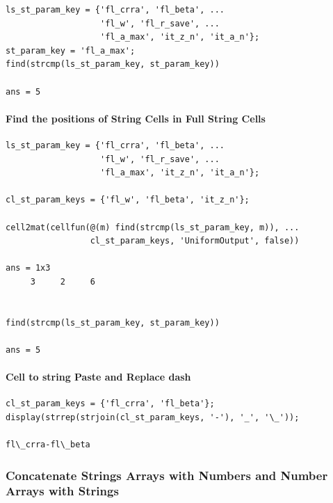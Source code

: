 \documentclass[
]{book}
\begin{document}
\begin{verbatim}
ls_st_param_key = {'fl_crra', 'fl_beta', ...
                   'fl_w', 'fl_r_save', ...
                   'fl_a_max', 'it_z_n', 'it_a_n'};
st_param_key = 'fl_a_max';
find(strcmp(ls_st_param_key, st_param_key))

ans = 5
\end{verbatim}

\hypertarget{find-the-positions-of-string-cells-in-full-string-cells}{%
\paragraph{Find the positions of String Cells in Full String Cells}\label{find-the-positions-of-string-cells-in-full-string-cells}}

\begin{verbatim}
ls_st_param_key = {'fl_crra', 'fl_beta', ...
                   'fl_w', 'fl_r_save', ...
                   'fl_a_max', 'it_z_n', 'it_a_n'};

cl_st_param_keys = {'fl_w', 'fl_beta', 'it_z_n'};

cell2mat(cellfun(@(m) find(strcmp(ls_st_param_key, m)), ...
                 cl_st_param_keys, 'UniformOutput', false))

ans = 1x3    
     3     2     6


find(strcmp(ls_st_param_key, st_param_key))

ans = 5
\end{verbatim}

\hypertarget{cell-to-string-paste-and-replace-dash}{%
\paragraph{Cell to string Paste and Replace dash}\label{cell-to-string-paste-and-replace-dash}}

\begin{verbatim}
cl_st_param_keys = {'fl_crra', 'fl_beta'};
display(strrep(strjoin(cl_st_param_keys, '-'), '_', '\_'));

fl\_crra-fl\_beta
\end{verbatim}

\hypertarget{concatenate-strings-arrays-with-numbers-and-number-arrays-with-strings}{%
\subsubsection{Concatenate Strings Arrays with Numbers and Number Arrays with Strings}\label{concatenate-strings-arrays-with-numbers-and-number-arrays-with-strings}}
\end{document}
